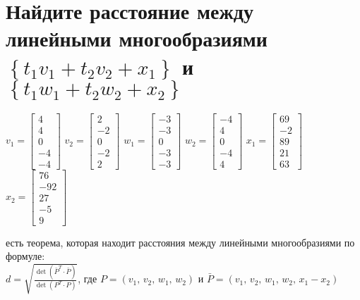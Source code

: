 \documentclass{article}
\newcommand{\ds}{\displaystyle}
\renewcommand{\f}{\frac}
\renewcommand{\l}{\left}
\renewcommand{\r}{\right}
\begin{document}
  \section{Найдите расстояние между линейными многообразиями $\l\{t_1v_1 + t_2v_2 + x_1\r\}$ и $\l\{t_1w_1 + t_2w_2 + x_2\r\}$}
  $ v_1 = \left[\begin{matrix}4\\4\\0\\-4\\-4\end{matrix}\right] $ \hfill
  $ v_2 = \left[\begin{matrix}2\\-2\\0\\-2\\2\end{matrix}\right] $ \hfill
  $ w_1 = \left[\begin{matrix}-3\\-3\\0\\-3\\-3\end{matrix}\right] $ \hfill
  $ w_2 = \left[\begin{matrix}-4\\4\\0\\-4\\4\end{matrix}\right] $ \hfill
  $ x_1 = \left[\begin{matrix}69\\-2\\89\\21\\63\end{matrix}\right] $ \hfill
  $ x_2 = \left[\begin{matrix}76\\-92\\27\\-5\\9\end{matrix}\right] $

  \noindent
  есть теорема, которая находит расстояния между линейными многообразиями по формуле: \\
  $\ds d = \sqrt{\f{\det(\bar{P}^T \cdot \bar{P})}{\det(P^T \cdot P)}}$,
  где $P = \l(v_1,\, v_2,\, w_1,\, w_2\r)$ и $\bar{P} = \l(v_1,\, v_2,\, w_1,\, w_2,\, x_1-x_2\r)$
\end{document}
